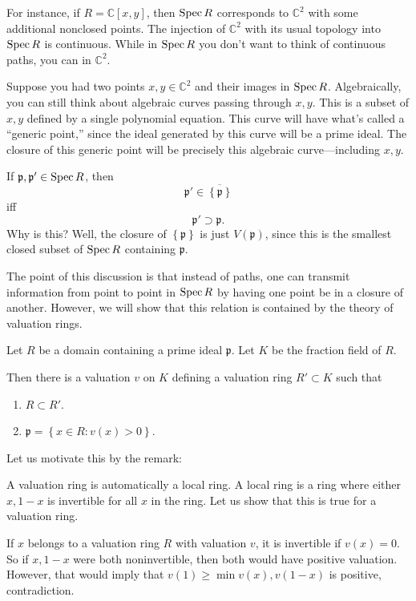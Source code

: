For instance, if $R = \mathbb{C}[x,y]$, then $\operatorname{Spec} R$ corresponds to
$\mathbb{C}^2$ with some additional nonclosed points.  The injection of
$\mathbb{C}^2$ with its usual topology into $\operatorname{Spec} R$ is continuous. While in
$\operatorname{Spec} R$ you don't want to think of continuous paths, you can in
$\mathbb{C}^2$.

Suppose you had two points $x,y \in \mathbb{C}^2$ and their images in $\operatorname{Spec}
R$.  Algebraically, you can still think about algebraic curves passing
through $x,y$.
This is a subset of $x,y$ defined by a single polynomial equation.
This curve will have what's called a ``generic point,'' since the ideal
generated by this curve will be a prime ideal.
The closure of this generic point will be precisely this algebraic
curve---including $x,y$.

\begin{remark}
If $ \mathfrak{p}, \mathfrak{p}' \in \operatorname{Spec} R$, then
\[ \mathfrak{p}' \in \overline{\left\{\mathfrak{p}\right\}}  \]
iff
\[ \mathfrak{p}' \supset \mathfrak{p}.  \]
Why is this? Well, the closure of $\left\{\mathfrak{p}\right\}$ is just
$V(\mathfrak{p})$, since this is the smallest closed subset of $\operatorname{Spec} R$
containing $\mathfrak{p}$.
\end{remark}

The point of this discussion is that instead of paths, one can transmit
information from point to point in $\operatorname{Spec} R$ by having one point be in a
closure of another.
However, we will show that this relation is contained by the theory of
valuation rings.

\begin{theorem}
Let $R$ be a domain containing a prime ideal $\mathfrak{p}$.  Let $K$ be the
fraction field of $R$.

Then there is a valuation  $v$ on $K$ defining a valuation ring $R' \subset
K$  such that
\begin{enumerate}
\item $R \subset R'$.
\item $\mathfrak{p} = \left\{x \in R: v(x) > 0\right\}$.
\end{enumerate}

\end{theorem}

Let us motivate this by the remark:
\begin{remark}
A valuation ring is automatically a local ring. A local ring is a ring where
either $x, 1-x$ is invertible for all $x$ in the ring. Let us show that this is
true for a valuation ring.

If $x $ belongs to a valuation ring $R$ with valuation $v$, it is invertible if
$v(x)=0$.  So if $x, 1-x$ were both noninvertible, then both would have
positive valuation.  However, that would imply that $v(1) \geq \min v(x),
v(1-x)$ is positive, contradiction.
\end{remark}

